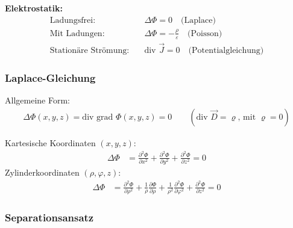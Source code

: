 \textbf{Elektrostatik:}
\begin{align}
\text{Ladungsfrei:} \quad &\Delta \Phi = 0 \quad \text{(Laplace)}\\
\text{Mit Ladungen:} \quad &\Delta \Phi = -\frac{\rho}{\varepsilon} \quad \text{(Poisson)}\\
\text{Stationäre Strömung:} \quad &\text{div } \vec{J} = 0 \quad \text{(Potentialgleichung)}
\end{align}


\subsubsection{Laplace-Gleichung}
Allgemeine Form:
\begin{align}
\Delta\Phi(x, y, z) = \text{div grad } \Phi(x, y, z) = 0 \qquad (\text{div } \vec{D} = \varrho \text{, mit }\varrho = 0)
\end{align}




Kartesische Koordinaten $(x, y, z)$:
\begin{align}
\Delta \Phi &= \frac{\partial^2 \Phi}{\partial x^2} + \frac{\partial^2 \Phi}{\partial y^2} + \frac{\partial^2 \Phi}{\partial z^2} = 0
\end{align}
Zylinderkoordinaten $(\rho, \varphi, z)$:
\begin{align}
\Delta \Phi &= \frac{\partial^2 \Phi}{\partial \rho^2} + \frac{1}{\rho}\frac{\partial \Phi}{\partial \rho} + \frac{1}{\rho^2}\frac{\partial^2 \Phi}{\partial \varphi^2} + \frac{\partial^2 \Phi}{\partial z^2} = 0
\end{align}

































\subsubsection{Separationsansatz}

